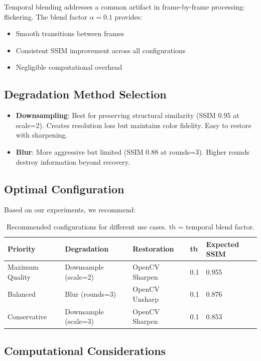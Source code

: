 \documentclass[11pt,a4paper]{article}
\begin{document}
Temporal blending addresses a common artifact in frame-by-frame processing: flickering. The blend factor $\alpha=0.1$ provides:
\begin{itemize}
    \item Smooth transitions between frames
    \item Consistent SSIM improvement across all configurations
    \item Negligible computational overhead
\end{itemize}

\subsection{Degradation Method Selection}

\begin{itemize}
    \item \textbf{Downsampling}: Best for preserving structural similarity (SSIM 0.95 at scale=2). Creates resolution loss but maintains color fidelity. Easy to restore with sharpening.
    \item \textbf{Blur}: More aggressive but limited (SSIM 0.88 at rounds=3). Higher rounds destroy information beyond recovery.
\end{itemize}

\subsection{Optimal Configuration}

Based on our experiments, we recommend:

\begin{table}[h]
\centering
\begin{tabular}{lllll}
\toprule
\textbf{Priority} & \textbf{Degradation} & \textbf{Restoration} & \textbf{tb} & \textbf{Expected SSIM} \\
\midrule
Maximum Quality & Downsample (scale=2) & OpenCV Sharpen & 0.1 & 0.955 \\
Balanced & Blur (rounds=3) & OpenCV Unsharp & 0.1 & 0.876 \\
Conservative & Downsample (scale=3) & OpenCV Sharpen & 0.1 & 0.853 \\
\bottomrule
\end{tabular}
\caption{Recommended configurations for different use cases. tb = temporal blend factor.}
\end{table}

\subsection{Computational Considerations}
\end{document}
